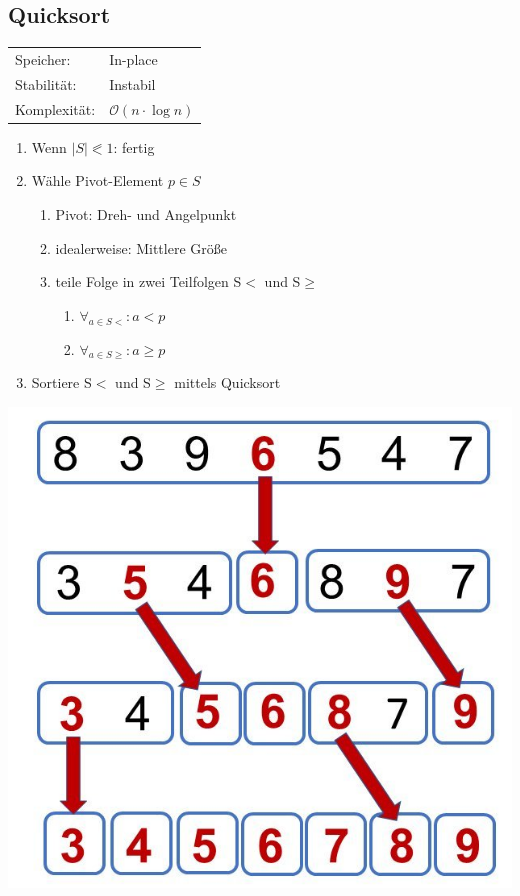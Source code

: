 \documentclass[12pt,a4paper]{article}
\begin{document}
\subsection{Quicksort}
\begin{tabularx}{\textwidth}{l l}
	Speicher: &In-place\\
	Stabilität: &Instabil\\
	Komplexität: &$\mathcal{O}(n \cdot \log n)$\\
\end{tabularx}
\vspace{.8cm}
\newline
\begin{minipage}[c]{0.6\textwidth}
	\begin{enumerate}
		\item Wenn $|S| \eqslantless 1$: fertig
		\item Wähle Pivot-Element $p \in S$
		\begin{enumerate}
			\item Pivot: Dreh- und Angelpunkt
			\item idealerweise: Mittlere Größe
			\item teile Folge in zwei Teilfolgen S$<$ und S$\geqslant $
			\begin{enumerate}
				\item $\forall_{a \in S<}: a<p$
				\item $\forall_{a \in S\geqslant}: a \geqslant p$
			\end{enumerate}
		\end{enumerate}
		\item Sortiere S$<$ und S$\geqslant $ mittels Quicksort
	\end{enumerate}
\end{minipage}
\begin{minipage}[c]{0.4\textwidth}
	\begin{center}
		\includegraphics[scale=0.18]{Bilder/quicksort.jpeg}		
	\end{center}
\end{minipage}
\end{document}
